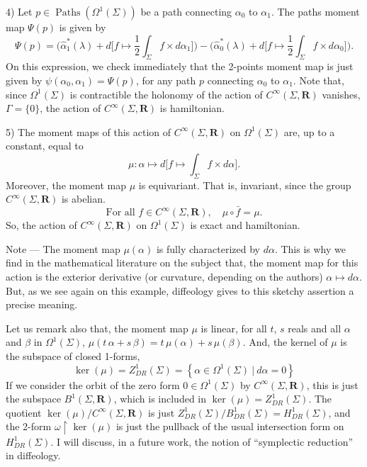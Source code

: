 \documentclass[10pt,reqno,twoside]{amsart}
\newcommand{\RR}{\mathbf{R}}
\DeclareMathOperator{\Paths}{Paths}
\newcommand{\Cinfty}{C^\infty}
\newcommand{\undemi}{\frac{1}{2}}
\newcommand{\R}{R}
\newcommand{\D}{D}
\newcommand{\B}{B}
\newcommand{\Z}{Z}
\theoremstyle{plain}
\theoremstyle{definition}
\begin{document}
  4) Let $p \in \Paths(\Omega^1(\Sigma))$ be a path connecting $\alpha_0$ to $\alpha_1$.
  The paths moment map $\Psi(p)$ is given by
  $$
    \Psi(p) = \bigg(\hat \alpha_1^*(\lambda) + d\bigg[f \mapsto \undemi \int_\Sigma f \times d\alpha_1\bigg]\bigg) - \bigg(\hat \alpha_0^*(\lambda) + d \bigg[f \mapsto \undemi \int_\Sigma f \times d\alpha_0 \bigg] \bigg).
    $$
  On this expression,
  we check immediately that the 2-points moment map is just given by $\psi(\alpha_0,\alpha_1) = \Psi(p)$,
  for any path $p$ connecting $\alpha_0$ to $\alpha_1$.
  Note that,
  since $\Omega^1(\Sigma)$ is contractible the holonomy of the action of $\Cinfty(\Sigma,\RR)$ vanishes,
  $\Gamma = \{0\}$,
  the action of $\Cinfty(\Sigma,\RR)$ is hamiltonian.
  
  5) The moment maps of this action of $\Cinfty(\Sigma,\RR)$ on $\Omega^1(\Sigma)$ are,
  up to a constant,
  equal to
  $$
    \mu : \alpha \mapsto d \bigg[ f \mapsto \int_\Sigma f \times d\alpha\bigg].
    $$
  Moreover,
  the moment map $\mu$ is equivariant.
  That is,
  invariant,
  since the group $\Cinfty(\Sigma,\RR)$ is abelian.
  $$
    \mbox{For all $f \in \Cinfty(\Sigma,\RR)$}, \quad \mu \circ \bar f = \mu.
    $$
  So,
  the action of $\Cinfty(\Sigma,\RR)$ on $\Omega^1(\Sigma)$ is exact and hamiltonian.
  
  {\sc Note} --- The moment map $\mu(\alpha)$ is fully characterized by $d\alpha$.
  This is why we find in the mathematical literature on the subject that,
  the moment map for this action is the exterior derivative (or curvature, depending on the authors) $\alpha \mapsto d\alpha$.
  But,
  as we see again on this example,
  diffeology gives to this sketchy assertion a precise meaning.
  
  Let us remark also that,
  the moment map $\mu$ is linear,
  for all $t$, $s$ reals and all $\alpha$ and $\beta$ in $\Omega^1(\Sigma)$,
  $\mu(t\,\alpha+s\,\beta) = t\,\mu(\alpha)+s\,\mu(\beta)$.
  And,
  the kernel of $\mu$ is the subspace of closed 1-forms,
  $$
    \ker(\mu) = \Z^1_{\D\R}(\Sigma) = \left\{ \alpha \in \Omega^1(\Sigma) \ \vert \ d\alpha = 0 \right\}
    $$
  If we consider the orbit of the zero form $0 \in \Omega^1(\Sigma)$ by $\Cinfty(\Sigma,\RR)$,
  this is just the subspace $\B^1(\Sigma,\RR)$,
  which is included in $\ker(\mu) = \Z^1_{\D\R}(\Sigma)$.
  The quotient $\ker(\mu)/ \Cinfty(\Sigma,\RR)$ is just $ \Z^1_{\D\R}(\Sigma) / \B^1_{\D\R}(\Sigma)= H^1_{\D\R}(\Sigma)$,
  and the 2-form $\omega \restriction \ker(\mu)$ is just the pullback of the usual intersection form on $H^1_{\D\R}(\Sigma)$.
  I will discuss,
  in a future work,
  the notion of ``symplectic reduction'' in diffeology.
  
\end{document}
